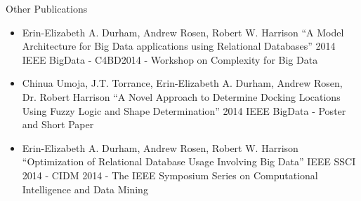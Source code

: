 \documentclass[11pt]{beamer}
\begin{document}
\begin{frame}{Other Publications}
	
	\begin{itemize}
		\item  Erin-Elizabeth A. Durham, Andrew Rosen, Robert W. Harrison
		``A Model Architecture for Big Data applications using Relational Databases''
		2014 IEEE BigData - C4BD2014 - Workshop on Complexity for Big Data  
		\item Chinua Umoja, J.T. Torrance, Erin-Elizabeth A. Durham, Andrew Rosen, Dr. Robert Harrison
		``A Novel Approach to Determine Docking Locations Using Fuzzy Logic and Shape Determination''
		2014 IEEE BigData - Poster and Short Paper 
		\item  Erin-Elizabeth A. Durham, Andrew Rosen, Robert W. Harrison
		``Optimization of Relational Database Usage Involving Big Data'' 
		IEEE SSCI 2014 - CIDM 2014 - The IEEE Symposium Series on Computational Intelligence and Data Mining 
	\end{itemize}
\end{frame}
\end{document}
